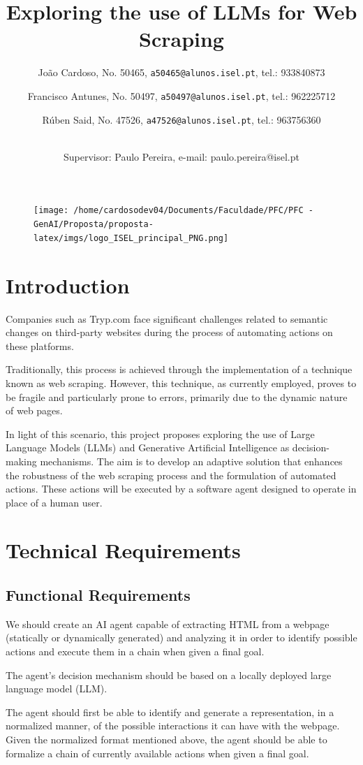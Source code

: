 \documentclass{article}
\title{\textbf{Exploring the use of LLMs for Web Scraping}}
\author{
	João Cardoso, No. 50465, \texttt{a50465@alunos.isel.pt}, tel.: 933840873 \\
	\and
	Francisco Antunes, No. 50497, \texttt{a50497@alunos.isel.pt}, tel.: 962225712 \\
	\and
	Rúben Said, No. 47526, \texttt{a47526@alunos.isel.pt}, tel.: 963756360
	\and
	\\
	 Supervisor: Paulo Pereira, e-mail: paulo.pereira@isel.pt
}
\begin{document}
	\begin{figure}[htbp]
		\begin{center}
			\texttt{[image: /home/cardosodev04/Documents/Faculdade/PFC/PFC - GenAI/Proposta/proposta-latex/imgs/logo\_ISEL\_principal\_PNG.png]}	
			\maketitle
		\end{center}
	\end{figure}
	\pagebreak
	\section{Introduction}
	\setlength\parindent{24pt}
	Companies such as Tryp.com face significant challenges related to semantic changes on third-party websites during the process of automating actions on these platforms.
	
	Traditionally, this process is achieved through the implementation of a technique known as web scraping. However, this technique, as currently employed, proves to be fragile and particularly prone to errors, primarily due to the dynamic nature of web pages.
	
	In light of this scenario, this project proposes exploring the use of Large Language Models (LLMs) and Generative Artificial Intelligence as decision-making mechanisms. The aim is to develop an adaptive solution that enhances the robustness of the web scraping process and the formulation of automated actions. These actions will be executed by a software agent designed to operate in place of a human user.
	\pagebreak
	
	\section{Technical Requirements}
	\subsection{Functional Requirements}
		We should create an AI agent capable of extracting HTML from a webpage (statically or dynamically generated) and analyzing it in order to identify possible actions and execute them in a chain when given a final goal.
        
		The agent's decision mechanism should be based on a locally deployed large language model (LLM).
        
		The agent should first be able to identify and generate a representation, in a normalized manner, of the possible interactions it can have with the webpage.
		Given the normalized format mentioned above, the agent should be able to formalize a chain of currently available actions when given a final goal.
        
\end{document}
